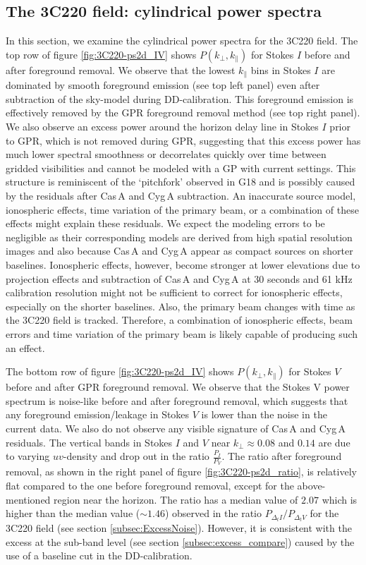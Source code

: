 \documentclass[fleqn,usenatbib]{mnras}
\begin{document}
\subsection{The 3C220 field: cylindrical power spectra}\label{sec:PSpec_3C220}
In this section, we examine the cylindrical power spectra for the 3C220 field. The top row of figure \ref{fig:3C220-ps2d_IV} shows $P(k_{\perp},k_{\parallel})$ for Stokes $I$ before and after foreground removal. We observe that the lowest $k_{\parallel}$ bins in Stokes $I$ are dominated by smooth foreground emission (see top left panel) even after subtraction of the sky-model during DD-calibration. This foreground emission is effectively removed by the GPR foreground removal method (see top right panel). We also observe an excess power around the horizon delay line in Stokes $I$ prior to GPR, which is not removed during GPR, suggesting that this excess power has much lower spectral smoothness or decorrelates quickly over time between gridded visibilities and cannot be modeled with a GP with current settings. This structure is reminiscent of the `pitchfork' observed in G18 and is possibly caused by the residuals after Cas\,A and Cyg\,A subtraction. An inaccurate source model, ionospheric effects, time variation of the primary beam, or a combination of these effects might explain these residuals. We expect the modeling errors to be negligible as their corresponding models are derived from high spatial resolution images and also because Cas\,A and Cyg\,A appear as compact sources on shorter baselines. Ionospheric effects, however, become stronger at lower elevations due to projection effects and subtraction of Cas\,A and Cyg\,A at 30 seconds and 61 kHz calibration resolution might not be sufficient to correct for ionospheric effects, especially on the shorter baselines. Also, the primary beam changes with time as the 3C220 field is tracked. Therefore, a combination of ionospheric effects, beam errors and time variation of the primary beam is likely capable of producing such an effect. 

The bottom row of figure \ref{fig:3C220-ps2d_IV} shows $P(k_{\perp},k_{\parallel})$ for Stokes $V$ before and after GPR foreground removal. We observe that the Stokes V power spectrum is noise-like before and after foreground removal, which suggests that any foreground emission/leakage in Stokes $V$ is lower than the noise in the current data. We also do not observe any visible signature of Cas\,A and Cyg\,A residuals. The vertical bands in Stokes $I$ and $V$ near $k_{\perp} \approx 0.08$ and $0.14$ are due to varying $uv$-density and drop out in the ratio $\frac{P_{I}}{P_{V}}$. The ratio after foreground removal, as shown in the right panel of figure \ref{fig:3C220-ps2d_ratio}, is relatively flat compared to the one before foreground removal, except for the above-mentioned region near the horizon. The ratio has a median value of $2.07$ which is higher than the median value ($\sim 1.46$) observed in the ratio $P_{\Delta_t I} / P_{\Delta_t V}$ for the 3C220 field (see section \ref{subsec:ExcessNoise}). However, it is consistent with the excess at the sub-band level (see section \ref{subsec:excess_compare}) caused by the use of a baseline cut in the DD-calibration. 
\end{document}

